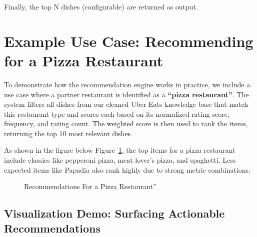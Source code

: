 \documentclass[
  11pt,
  a4paper,
  DIV=11,
  numbers=noendperiod]{scrartcl}
\begin{document}
Finally, the top N dishes (configurable) are returned as output.

\section{Example Use Case: Recommending for a Pizza
Restaurant}\label{example-use-case-recommending-for-a-pizza-restaurant}

To demonstrate how the recommendation engine works in practice, we
include a use case where a partner restaurant is identified as a
\textbf{``pizza restaurant''}. The system filters all dishes from our
cleaned Uber Eats knowledge base that match this restaurant type and
scores each based on its normalized rating score, frequency, and rating
count. The weighted score is then used to rank the items, returning the
top 10 most relevant dishes.

As shown in the figure below Figure~\ref{fig-rec-example}, the top items
for a pizza restaurant include classics like pepperoni pizza, meat
lover's pizza, and spaghetti. Less expected items like Papadia also rank
highly due to strong metric combinations.

\begin{figure}

\caption{\label{fig-rec-example}Recommendations For a Pizza
Restaurant''}


\end{figure}%

\subsection{Visualization Demo: Surfacing Actionable
Recommendations}\label{visualization-demo-surfacing-actionable-recommendations}
\end{document}
